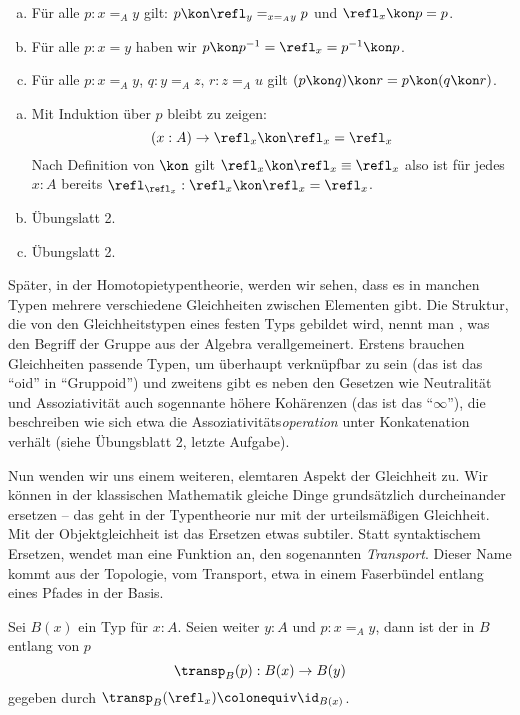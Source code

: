 \begin{lemma}
\label{gliecheits-gruppoid}
\begin{enumerate}[(a)]
\item Für alle $ p:x=_Ay$ gilt: $ p\kon\refl_y=_{x=_Ay} p$ und $\refl_x\kon p= p$.
\item Für alle $ p:x=y$ haben wir $ p\kon p^{-1}=\refl_x= p^{-1}\kon p$.
\item Für alle $ p:x=_Ay$, $ q:y=_Az$, $ r:z=_Au$ gilt
   $( p\kon q)\kon r= p\kon( q\kon r)$.
\end{enumerate}
\end{lemma}
\begin{beweis}
\begin{enumerate}[(a)]
\item Mit Induktion über $p$ bleibt zu zeigen:
 \[
    (x:A) \to \refl_x\kon\refl_x=\refl_x
 \]
 Nach Definition von $\kon$ gilt $\refl_x\kon\refl_x\equiv\refl_x$ also ist für jedes $x:A$ bereits $\refl_{\refl_x}:\refl_x\kon\refl_x=\refl_x$.
 \item Übungslatt 2.
 \item Übungslatt 2.
\end{enumerate}
\end{beweis}

Später, in der Homotopietypentheorie, werden wir sehen, dass es in manchen Typen mehrere verschiedene Gleichheiten zwischen Elementen gibt.
Die Struktur, die von den Gleichheitstypen eines festen Typs gebildet wird, nennt man , was den Begriff der Gruppe aus der Algebra verallgemeinert. Erstens brauchen Gleichheiten passende Typen, um überhaupt verknüpfbar zu sein (das ist das ``oid'' in ``Gruppoid'') und zweitens gibt es neben den Gesetzen wie Neutralität und Assoziativität auch sogennante höhere Kohärenzen (das ist das ``$\infty$''), die beschreiben wie sich etwa die Assoziativitäts\emph{operation} unter Konkatenation verhält (siehe Übungsblatt 2, letzte Aufgabe).

Nun wenden wir uns einem weiteren, elemtaren Aspekt der Gleichheit zu.
Wir können in der klassischen Mathematik gleiche Dinge grundsätzlich durcheinander ersetzen -- das geht in der Typentheorie nur mit der urteilsmäßigen Gleichheit.
Mit der Objektgleichheit ist das Ersetzen etwas subtiler.
Statt syntaktischem Ersetzen, wendet man eine Funktion an, den sogenannten \emph{Transport}.
Dieser Name kommt aus der Topologie, vom Transport, etwa in einem Faserbündel entlang eines Pfades in der Basis.

\begin{definition}
  Sei $B(x)$ ein Typ für $x:A$.
  Seien weiter $y:A$ und $p:x=_Ay$, dann ist der  in $B$ entlang von $p$
  \[
    \transp_B(p): B(x)\to B(y)
  \]
  gegeben durch $\transp_B(\refl_x)\colonequiv \id_{B(x)}$.  
\end{definition}

